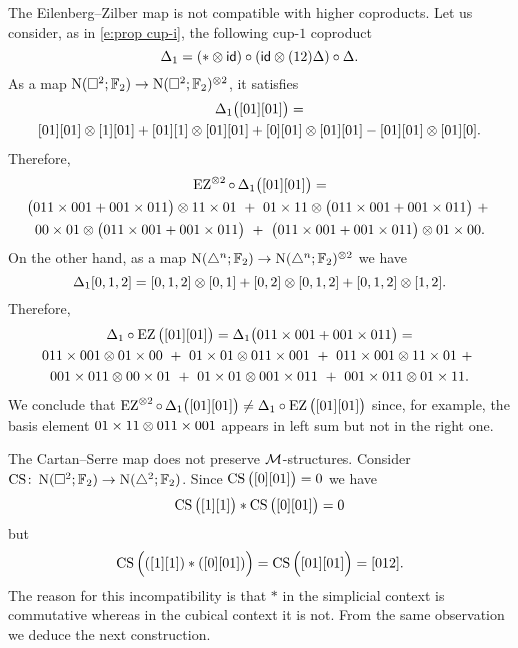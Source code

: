 \begin{example*}
	The Eilenberg--Zilber map is not compatible with higher coproducts.
	Let us consider, as in \cref{e:prop cup-i}, the following cup-$1$ coproduct
	\[
	\Delta_1 = (\ast \otimes \mathsf{id}) \circ (\mathsf{id} \otimes (12) \Delta) \circ \Delta.
	\]
	As a map $\operatorname{N}(\square^2; {\mathbb{F}_2}) \to \operatorname{N}(\square^2; {\mathbb{F}_2})^{\otimes 2}$, it satisfies
	\begin{multline*}
		\Delta_1 \big( [01] [01] \big) = \\
		[01][01] \otimes [1][01] + [01][1] \otimes [01][01] + [0][01] \otimes [01][01] - [01][01] \otimes [01][0].
	\end{multline*}
	Therefore,
	\begin{multline*}
		\operatorname{EZ}^{\otimes 2} \circ \, \Delta_1 \big( [01][01] \big) = \\
		\big( 011\times001 + 001\times011 \big) \otimes 11 \times 01 \ +\
		01\times11 \otimes \big( 011\times001 + 001\times011 \big) \ +\ \\
		00\times01 \otimes \big( 011\times001 + 001\times011 \big) \ +\
		\big( 011\times001 + 001\times011 \big) \otimes 01\times00.
	\end{multline*}
	On the other hand, as a map $\operatorname{N}(\triangle^n; {\mathbb{F}_2}) \to \operatorname{N}(\triangle^n; {\mathbb{F}_2})^{\otimes 2}$ we have
	\[
	\Delta_1 [0,1,2] = [0,1,2] \otimes [0,1] + [0,2] \otimes [0,1,2] + [0,1,2] \otimes [1,2].
	\]
	Therefore,
	\begin{multline*}
		\Delta_1 \circ \operatorname{EZ} \big( [01] [01] \big) = \Delta_1 \big( 011\times001 + 001\times011 \big) = \\
		011\times001 \otimes 01\times00 \ + \
		01\times01 \otimes 011\times001 \ + \
		011\times001 \otimes 11\times01 \ + \ \\
		001\times011 \otimes 00\times01 \ + \
		01\times01 \otimes 001\times011 \ + \
		001\times011 \otimes 01\times11.
	\end{multline*}
	We conclude that $\operatorname{EZ}^{\otimes 2} \circ \, \Delta_1 \big( [01][01] \big) \neq \Delta_1 \circ \operatorname{EZ} \big( [01] [01] \big)$ since, for example, the basis element $01\times11 \otimes 011\times001$ appears in left sum but not in the right one.
\end{example*}

\begin{example*}
	The Cartan--Serre map does not preserve $\mathcal{M}$-structures.
	Consider $\operatorname{CS} \colon \operatorname{N}(\square^2; {\mathbb{F}_2}) \to \operatorname{N}(\triangle^2; {\mathbb{F}_2})$.
	Since $\operatorname{CS} \big( [0][01] \big) = 0$ we have
	\[
	\operatorname{CS} \big( [1][1] \big) \ast \operatorname{CS} \big( [0][01] \big) = 0
	\]
	but
	\[
	\operatorname{CS} \Big( ([1][1]) \ast ([0][01]) \Big) =
	\operatorname{CS} \Big( [01][01] \Big) = [012].
	\]
	The reason for this incompatibility is that $\ast$ in the simplicial context is commutative whereas in the cubical context it is not.
	From the same observation we deduce the next construction.
\end{example*}

